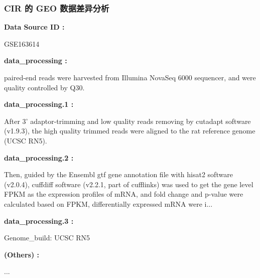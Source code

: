 \documentclass[
]{article}
\begin{document}
\hypertarget{cir-ux7684-geo-ux6570ux636eux5deeux5f02ux5206ux6790}{%
\subsubsection{CIR 的 GEO 数据差异分析}\label{cir-ux7684-geo-ux6570ux636eux5deeux5f02ux5206ux6790}}

\begin{center}\begin{tcolorbox}[colback=gray!10, colframe=gray!50, width=0.9\linewidth, arc=1mm, boxrule=0.5pt]
\textbf{
Data Source ID
:}

\vspace{0.5em}

    GSE163614

\vspace{2em}


\textbf{
data\_processing
:}

\vspace{0.5em}

    paired-end reads were harvested from Illumina NovaSeq
6000 sequencer, and were quality controlled by Q30.

\vspace{2em}


\textbf{
data\_processing.1
:}

\vspace{0.5em}

    After 3’ adaptor-trimming and low quality reads
removing by cutadapt software (v1.9.3), the high quality
trimmed reads were aligned to the rat reference genome
(UCSC RN5).

\vspace{2em}


\textbf{
data\_processing.2
:}

\vspace{0.5em}

    Then, guided by the Ensembl gtf gene annotation file
with hisat2 software (v2.0.4), cuffdiff software (v2.2.1,
part of cufflinks) was used to get the gene level FPKM as
the expression profiles of mRNA, and fold change and
p-value were calculated based on FPKM, differentially
expressed mRNA were i...

\vspace{2em}


\textbf{
data\_processing.3
:}

\vspace{0.5em}

    Genome\_build: UCSC RN5

\vspace{2em}


\textbf{
(Others)
:}

\vspace{0.5em}

    ...

\vspace{2em}
\end{tcolorbox}
\end{center}
\end{document}
